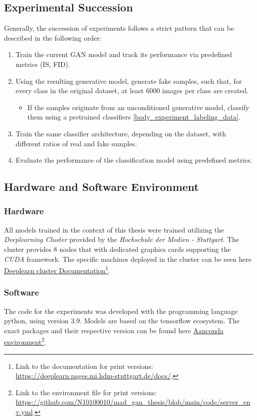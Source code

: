 \subsection{Experimental Succession}\label{body_experiment_succession}
Generally, the succession of experiments follows a strict pattern that can be described in the following order:
\begin{enumerate}
    \item Train the current GAN model and track its performance via predefined metrics (IS, FID).
    \item Using the resulting generative model, generate fake samples, such that, for every class in the original dataset, at least \(6000\) images per class are created.
    \begin{itemize}
        \item If the samples originate from an unconditioned generative model, classify them using a pretrained classifiers \ref{body_experiment_labeling_data}.
    \end{itemize}
    \item Train the same classifier architecture, depending on the dataset, with different ratios of real and fake samples.
    \item Evaluate the performance of the classification model using predefined metrics.
\end{enumerate}

\subsection{Hardware and Software Environment}

\subsubsection{Hardware}
All models trained in the context of this thesis were trained utilizing the \textit{Deeplearning Cluster} provided by the \textit{Hochschule der Medien - Stuttgart}. The cluster provides 8 nodes that with dedicated graphics cards supporting the \textit{CUDA} framework. The specific machines deployed in the cluster can be seen here \href{https://deeplearn.pages.mi.hdm-stuttgart.de/docs/}{Deeplearn cluster Documentation}\footnote{Link to the documentation for print versions: \url{https://deeplearn.pages.mi.hdm-stuttgart.de/docs/}.}.

\subsubsection{Software}
The code for the experiments was developed with the programming language python, using version \(3.9\). Models are based on the tensorflow ecosystem. The exact packages and their respective version can be found here \href{https://github.com/N10100010/mad_gan_thesis/blob/main/code/server_env.yml}{Aanconda environment}\footnote{Link to the environment file for print versions: \url{https://github.com/N10100010/mad_gan_thesis/blob/main/code/server_env.yml}.}.



\newpage
